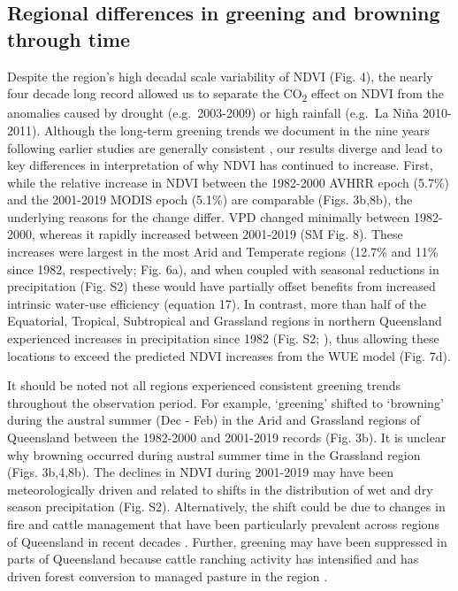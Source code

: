 \documentclass[gc, manuscript]{copernicus}
\begin{document}
\subsection{Regional differences in greening and browning through time}

Despite the region's high decadal scale variability of NDVI (Fig. 4),
the nearly four decade long record allowed us to separate the
CO\textsubscript{2} effect on NDVI from the anomalies caused by drought
(e.g.~2003-2009) or high rainfall (e.g.~La Niña 2010-2011). Although the
long-term greening trends we document in the nine years following
earlier studies are generally consistent
\citep{donohueClimaterelatedTrendsAustralian2009c, ukkolaReducedStreamflowWaterstressed2016b},
our results diverge and lead to key differences in interpretation of why
NDVI has continued to increase. First, while the relative increase in
NDVI between the 1982-2000 AVHRR epoch (5.7\%) and the 2001-2019 MODIS
epoch (5.1\%) are comparable (Figs. 3b,8b), the underlying reasons for
the change differ. VPD changed minimally between 1982-2000, whereas it
rapidly increased between 2001-2019 (SM Fig. 8). These increases were
largest in the most Arid and Temperate regions (12.7\% and 11\% since
1982, respectively; Fig. 6a), and when coupled with seasonal reductions
in precipitation (Fig. S2) these would have partially offset benefits
from increased intrinsic water-use efficiency (equation 17). In
contrast, more than half of the Equatorial, Tropical, Subtropical and
Grassland regions in northern Queensland experienced increases in
precipitation since 1982 (Fig. S2;
\citet{ukkolaExploringStationarityAustralian2019c}), thus allowing these
locations to exceed the predicted NDVI increases from the WUE model
(Fig. 7d).

It should be noted not all regions experienced consistent greening
trends throughout the observation period. For example, `greening'
shifted to `browning' during the austral summer (Dec - Feb) in the Arid
and Grassland regions of Queensland between the 1982-2000 and 2001-2019
records (Fig. 3b). It is unclear why browning occurred during austral
summer time in the Grassland region (Figs. 3b,4,8b). The declines in
NDVI during 2001-2019 may have been meteorologically driven and related
to shifts in the distribution of wet and dry season precipitation (Fig.
S2). Alternatively, the shift could be due to changes in fire and cattle
management that have been particularly prevalent across regions of
Queensland in recent decades \citep{seabrookCattleCropsClearing2006}.
Further, greening may have been suppressed in parts of Queensland
because cattle ranching activity has intensified and has driven forest
conversion to managed pasture in the region
\citep{mcalpineIncreasingWorldConsumption2009}.
\end{document}
